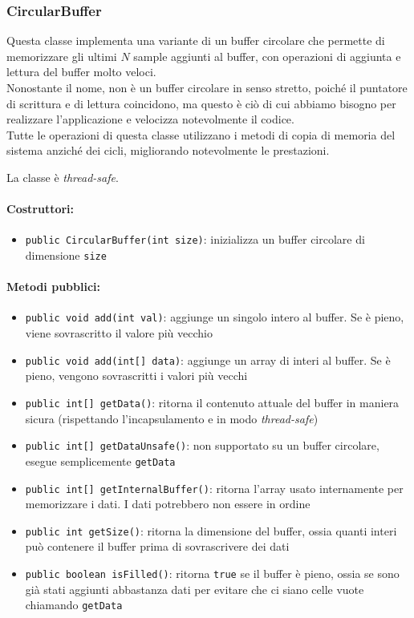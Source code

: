 \subsubsection{CircularBuffer}
Questa classe implementa una variante di un buffer circolare che permette di memorizzare gli ultimi $N$ sample aggiunti al buffer, con operazioni di aggiunta e lettura del buffer molto veloci.\\
Nonostante il nome, non è un buffer circolare in senso stretto, poiché il puntatore di scrittura e di lettura coincidono, ma questo è ciò di cui abbiamo bisogno per realizzare l'applicazione e velocizza notevolmente il codice.\\
Tutte le operazioni di questa classe utilizzano i metodi di copia di memoria del sistema anziché dei cicli, migliorando notevolmente le prestazioni.

La classe è \textit{thread-safe}.

\paragraph{Costruttori:}\begin{itemize}
	\item \texttt{public CircularBuffer(int size)}: inizializza un buffer circolare di dimensione \texttt{size}
\end{itemize}

\paragraph{Metodi pubblici:}\begin{itemize}
	\item \texttt{public void add(int val)}: aggiunge un singolo intero al buffer. Se è pieno, viene sovrascritto il valore più vecchio
	\item \texttt{public void add(int[] data)}: aggiunge un array di interi al buffer. Se è pieno, vengono sovrascritti i valori più vecchi
	\item \texttt{public int[] getData()}: ritorna il contenuto attuale del buffer in maniera sicura (rispettando l'incapsulamento e in modo \textit{thread-safe})
	\item \texttt{public int[] getDataUnsafe()}: non supportato su un buffer circolare, esegue semplicemente \texttt{getData}
	\item \texttt{public int[] getInternalBuffer()}: ritorna l'array usato internamente per memorizzare i dati. I dati potrebbero non essere in ordine
	\item \texttt{public int getSize()}: ritorna la dimensione del buffer, ossia quanti interi può contenere il buffer prima di sovrascrivere dei dati
	\item \texttt{public boolean isFilled()}: ritorna \texttt{true} se il buffer è pieno, ossia se sono già stati aggiunti abbastanza dati per evitare che ci siano celle vuote chiamando \texttt{getData}
\end{itemize}


